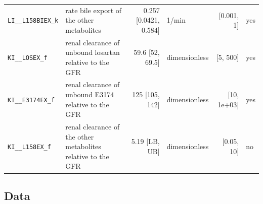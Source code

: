 \documentclass{article}
\begin{document}
\begin{longtable}{llrlrl}
\texttt{LI\_\_L158BIEX\_k} & rate bile export of the other metabolites & 0.257 [0.0421, 0.584] & 1/min & [0.001, 1] & yes \\
\texttt{KI\_\_LOSEX\_f} & renal clearance of unbound losartan relative to the GFR & 59.6 [52, 69.5] & dimensionless & [5, 500] & yes \\
\texttt{KI\_\_E3174EX\_f} & renal clearance of unbound E3174 relative to the GFR & 125 [105, 142] & dimensionless & [10, 1e+03] & yes \\
\texttt{KI\_\_L158EX\_f} & renal clearance of the other metabolites relative to the GFR & 5.19 [LB, UB] & dimensionless & [0.05, 10] & no \\
\end{longtable}

\subsection{Data}
\end{document}
